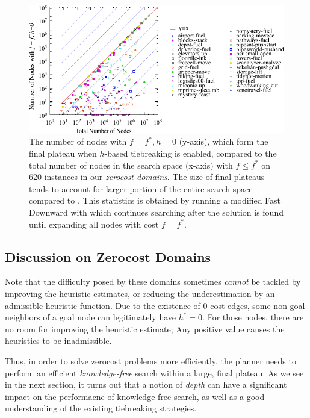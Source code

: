 \begin{figure}[htbp]
  \centering
  \includegraphics{tables/aaai16-frontier/zerocost/lmcut_frontier-front.pdf}
  \caption{
 The number of nodes with $f=f^*, h=0$ (y-axis), which form
  the final plateau when $h$-based tiebreaking is enabled, compared to
 the total number of nodes in the search space (x-axis) with
 $f\leq f^*$ on 620 instances in our \emph{zerocost domains}.
 The size of final plateaus tends to account for larger portion of the
 entire search space compared to .
 This statistics is obtained by running a modified Fast Downward with
 \lmcut which continues searching after the solution is found
 until expanding all nodes with cost $f=f^*$.
 }
 \label{fig:plateau-zerocost}
\end{figure}

\subsection{Discussion on Zerocost Domains}

Note that the difficulty posed by these domains sometimes \emph{cannot}
be tackled by improving the heuristic estimates, or reducing the
underestimation by an admissible heuristic function.  Due to the
existence of 0-cost edges, some non-goal neighbors of a goal node can
legitimately have $h^*=0$. For those nodes,
there are no room for improving the heuristic estimate; Any positive
value causes the heuristics to be inadmissible.

Thus, in order to solve zerocost problems more efficiently, the planner
needs to perform an efficient \emph{knowledge-free} search within a
large, final plateau. As we see in the next section,
it turns out that a notion of \emph{depth} can
have a significant impact on the performacne of knowledge-free search,
as well as a good understanding of the existing tiebreaking strategies.

